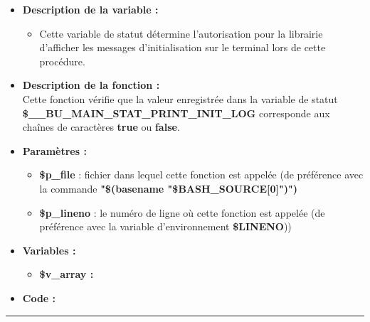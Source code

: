 \documentclass[a4paper,10pt]{article}
\begin{document}
\begin{itemize}
    \item \textbf{Description de la variable :}
    \begin{itemize}
        \item Cette variable de statut détermine l'autorisation pour la librairie d'afficher les messages d'initialisation sur le terminal lors de cette procédure.\\[1\baselineskip]
    \end{itemize}


    \item \textbf{Description de la fonction :}\\
        Cette fonction vérifie que la valeur enregistrée dans la variable de statut\\ \textbf{\color{orange}\$\_\_BU\_MAIN\_STAT\_PRINT\_INIT\_LOG} corresponde aux chaînes de caractères \textbf{true} ou \textbf{false}.\\[1\baselineskip]

    \item \textbf{Paramètres :}
    \begin{itemize}
        \item \color{orange}\textbf{\$p\_file}\color{white} : fichier dans lequel cette fonction est appelée (de préférence avec la commande \textbf{"\$(\color{gray}basename \color{white}"\color{orange}\$BASH\_SOURCE[0]\color{white}")")}\\[1\baselineskip]

        \item \color{orange}\textbf{\$p\_lineno}\color{white} : le numéro de ligne où cette fonction est appelée (de préférence avec la variable d'environnement \textbf{\color{orange}\$LINENO}))\\[1\baselineskip]
    \end{itemize}

    \item \textbf{Variables :}
    \begin{itemize}
        \item \textbf{\color{orange}\$v\_array\color{white} :}\\[1\baselineskip]
    \end{itemize}


    \item \textbf{Code :}
\end{itemize}



\color{blue}\par\noindent\rule{\textwidth}{0.4pt}\color{white}
\end{document}
